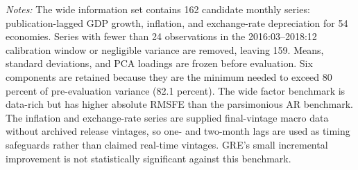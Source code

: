 \begin{table}[htbp]
\centering\scriptsize
\caption{One-month GRE comparison against a wide macroeconomic factor benchmark}
\label{tab:wide_factor}
\vspace{0.35em}
\begin{minipage}{0.97\textwidth}\footnotesize\textit{Notes:} The wide information set contains 162 candidate monthly series: publication-lagged GDP growth, inflation, and exchange-rate depreciation for 54 economies. Series with fewer than 24 observations in the 2016:03--2018:12 calibration window or negligible variance are removed, leaving 159. Means, standard deviations, and PCA loadings are frozen before evaluation. Six components are retained because they are the minimum needed to exceed 80 percent of pre-evaluation variance (82.1 percent). The wide factor benchmark is data-rich but has higher absolute RMSFE than the parsimonious AR benchmark. The inflation and exchange-rate series are supplied final-vintage macro data without archived release vintages, so one- and two-month lags are used as timing safeguards rather than claimed real-time vintages. GRE's small incremental improvement is not statistically significant against this benchmark.\end{minipage}
\end{table}
